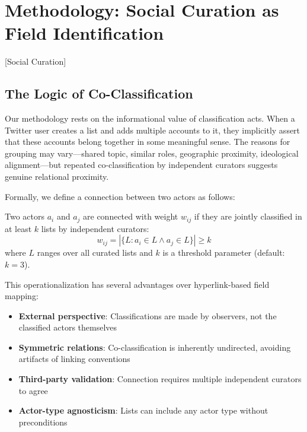 \documentclass[../main.tex]{subfiles}
\begin{document}
\section{Methodology: Social Curation as Field Identification}[Social Curation]

\subsection{The Logic of Co-Classification}

Our methodology rests on the informational value of classification acts. When a Twitter user creates a list and adds multiple accounts to it, they implicitly assert that these accounts belong together in some meaningful sense. The reasons for grouping may vary---shared topic, similar roles, geographic proximity, ideological alignment---but repeated co-classification by independent curators suggests genuine relational proximity.

Formally, we define a connection between two actors as follows:

\begin{definition}
Two actors $a_i$ and $a_j$ are connected with weight $w_{ij}$ if they are jointly classified in at least $k$ lists by independent curators:
\begin{equation}
    w_{ij} = |\{L : a_i \in L \wedge a_j \in L\}| \geq k
\end{equation}
where $L$ ranges over all curated lists and $k$ is a threshold parameter (default: $k = 3$).
\end{definition}

This operationalization has several advantages over hyperlink-based field mapping:

\begin{itemize}
    \item \textbf{External perspective}: Classifications are made by observers, not the classified actors themselves
    \item \textbf{Symmetric relations}: Co-classification is inherently undirected, avoiding artifacts of linking conventions
    \item \textbf{Third-party validation}: Connection requires multiple independent curators to agree
    \item \textbf{Actor-type agnosticism}: Lists can include any actor type without preconditions
\end{itemize}
\end{document}
